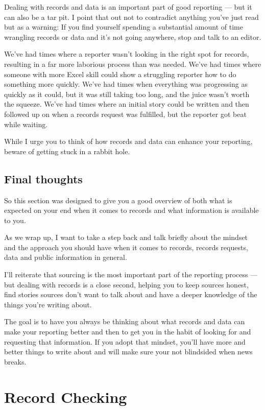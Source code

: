 \documentclass[
  11pt,
  american,
  letterpaperpaper,
  extrafontsizes,onecolumn,openright
  ]{memoir}
\begin{document}
Dealing with records and data is an important part of good reporting --- but it can also be a tar pit. I point that out not to contradict anything you've just read but as a warning: If you find yourself spending a substantial amount of time wrangling records or data and it's not going anywhere, stop and talk to an editor.

We've had times where a reporter wasn't looking in the right spot for records, resulting in a far more laborious process than was needed. We've had times where someone with more Excel skill could show a struggling reporter how to do something more quickly. We've had times when everything was progressing as quickly as it could, but it was still taking too long, and the juice wasn't worth the squeeze. We've had times where an initial story could be written and then followed up on when a records request was fulfilled, but the reporter got beat while waiting.

While I urge you to think of how records and data can enhance your reporting, beware of getting stuck in a rabbit hole.

\hypertarget{final-thoughts-1}{%
\section*{Final thoughts}\label{final-thoughts-1}}

So this section was designed to give you a good overview of both what is expected on your end when it comes to records and what information is available to you.

As we wrap up, I want to take a step back and talk briefly about the mindset and the approach you should have when it comes to records, records requests, data and public information in general.

I'll reiterate that sourcing is the most important part of the reporting process --- but dealing with records is a close second, helping you to keep sources honest, find stories sources don't want to talk about and have a deeper knowledge of the things you're writing about.

The goal is to have you always be thinking about what records and data can make your reporting better and then to get you in the habit of looking for and requesting that information. If you adopt that mindset, you'll have more and better things to write about and will make sure your not blindsided when news breaks.

\hypertarget{record-checking}{%
\chapter{Record Checking}\label{record-checking}}
\end{document}
